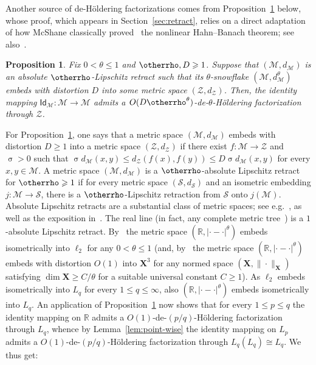 \documentclass[11pt,reqno]{amsart}
\newtheorem{prop}[theorem]{Proposition}
\newcommand{\R}{\mathbb{R}}
\renewcommand{\le}{\leqslant}
\renewcommand{\ge}{\geqslant}
\newcommand{\cZ}{\mathcal{Z}}
\newcommand{\X}{\mathbf X}
\newcommand{\Id}{\mathsf{Id}}
\newcommand{\MM}{\mathcal{M}}
\renewcommand{\SS}{\mathscr{S}}
\renewcommand{\r}{\otherrho}
\begin{document}
Another source of de-H\"oldering factorizations  comes from Proposition~\ref{prop:retract} below, whose proof, which appears in Section~\ref{sec:retract}, relies on a direct adaptation of how McShane classically proved~\cite{McS34} the nonlinear Hahn--Banach theorem; see also~\cite[Chapter~1]{BL00}.  

\begin{prop}\label{prop:retract} Fix $0<\theta\le 1$ and $\otherrho,D\ge 1$. Suppose that $(\MM,d_\MM)$ is an absolute $\otherrho$-Lipschitz retract such that its $\theta$-snowflake $(\MM,d_\MM^\theta)$ embeds with distortion $D$  into some metric space $(\cZ,d_\cZ)$. Then, the identity mapping $\Id_\MM:\MM\to \MM$ admits a $O( D\r^\theta)$-de-$\theta$-H\"oldering factorization through  $\cZ$.
\end{prop}


For Proposition~\ref{prop:retract}, one says that a metric space $(\MM,d_\MM)$ embeds with distortion $D\ge 1$ into a metric space $(\cZ,d_\cZ)$  if there exist $f:\MM\to \cZ$ and $\upsigma>0$ such that $\upsigma d_\MM(x,y)\le d_\cZ(f(x),f(y))\le D\upsigma d_\MM(x,y)$ for every $x,y\in \MM$. A metric space $(\MM,d_\MM)$ is a $\r$-absolute Lipschitz retract for $\r\ge 1$ if for every metric space $(\SS,d_\SS)$ and an isometric embedding $j:\MM\to \SS$,  there is a $\r$-Lipschitz retraction from $\SS$ onto $j(\MM)$. Absolute Lipschitz retracts are a substantial class of metric spaces; see e.g.~\cite{AP56,Lin64,PY95,LS05,Lan13}, as well as the exposition in~\cite[Chapter~1]{BL00}.  The real line (in fact, any complete metric tree~\cite{Dre84}) is a $1$-absolute Lipschitz retract. By~\cite{Sch37} the metric space $(\R,|\cdot-\cdot|^\theta)$ embeds isometrically into $\ell_2$ for any $0<\theta\le 1$ (and, by~\cite[Proposition~3 and Proposition~9]{NR26} the metric space $(\R,|\cdot-\cdot|^\theta)$ embeds with distortion $O(1)$ into $\X^3$ for any normed space $(\X,\|\cdot\|_\X)$ satisfying $\dim \X\ge C/\theta$ for a suitable universal constant $C\ge 1$). As $\ell_2$ embeds isometrically into $L_q$ for every $1\le q\le \infty$,  also $(\R,|\cdot-\cdot|^\theta)$ embeds isometrically into $L_q$.  An application of Proposition~\ref{prop:retract} now shows that for every $1\le p\le q$ the identity mapping on $\R$  admits a $O(1)$-de-$(p/q)$-H\"oldering factorization through $L_q$, whence by Lemma~\ref{lem:point-wise} the identity mapping on $L_p$ admits a $O(1)$-de-$(p/q)$-H\"oldering factorization through $L_q(L_q)\cong L_q$. We thus get:
\end{document}
